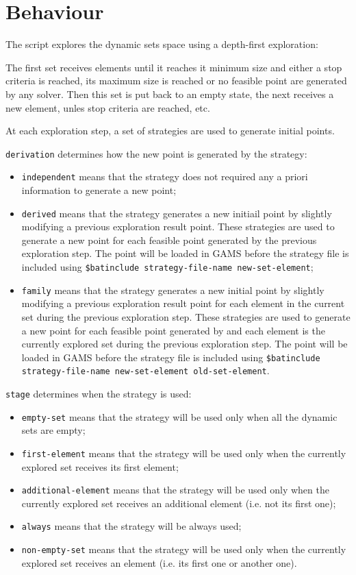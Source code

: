\section*{Behaviour}

The script explores the dynamic sets space using a depth-first exploration:

The first set receives elements until it reaches it minimum size and either a
stop criteria is reached, its maximum size is reached or no feasible point are
generated by any solver. Then this set is put back to an empty state, the next
receives a new element, unles stop criteria are reached, etc.

At each exploration step, a set of strategies are used to generate initial
points.

\texttt{derivation} determines how the new point is generated by the strategy:
\begin{itemize}
\item \texttt{independent} means that the strategy does not required any a
  priori information to generate a new point;
\item \texttt{derived} means that the strategy generates a new initiail point by
  slightly modifying a previous exploration result point. These strategies are
  used to generate a new point for each feasible point generated by the previous
  exploration step. The point will be loaded in GAMS before the strategy file is
  included using \texttt{\$batinclude strategy-file-name new-set-element};
\item \texttt{family} means that the strategy generates a new initial point by
  slightly modifying a previous exploration result point for each element in the
  current set during the previous exploration step. These strategies are used to
  generate a new point for each feasible point generated by and each element is
  the currently explored set during the previous exploration step. The point
  will be loaded in GAMS before the strategy file is included using
  \texttt{\$batinclude strategy-file-name new-set-element old-set-element}.
\end{itemize}

\texttt{stage} determines when the strategy is used:
\begin{itemize}
\item \texttt{empty-set} means that the strategy will be used only when all the
  dynamic sets are empty;
\item \texttt{first-element} means that the strategy will be used only when the
  currently explored set receives its first element;
\item \texttt{additional-element} means that the strategy will be used only when
  the currently explored set receives an additional element (i.e. not its first
  one);
\item \texttt{always} means that the strategy will be always used;
\item \texttt{non-empty-set} means that the strategy will be used only when the
  currently explored set receives an element (i.e. its first one or another
  one).
\end{itemize}

